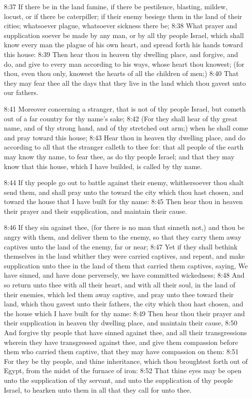 8:37 If there be in the land famine, if there be pestilence, blasting,
mildew, locust, or if there be caterpiller; if their enemy besiege
them in the land of their cities; whatsoever plague, whatsoever
sickness there be; 8:38 What prayer and supplication soever be made by
any man, or by all thy people Israel, which shall know every man the
plague of his own heart, and spread forth his hands toward this house:
8:39 Then hear thou in heaven thy dwelling place, and forgive, and do,
and give to every man according to his ways, whose heart thou knowest;
(for thou, even thou only, knowest the hearts of all the children of
men;) 8:40 That they may fear thee all the days that they live in the
land which thou gavest unto our fathers.

8:41 Moreover concerning a stranger, that is not of thy people Israel,
but cometh out of a far country for thy name's sake; 8:42 (For they
shall hear of thy great name, and of thy strong hand, and of thy
stretched out arm;) when he shall come and pray toward this house;
8:43 Hear thou in heaven thy dwelling place, and do according to all
that the stranger calleth to thee for: that all people of the earth
may know thy name, to fear thee, as do thy people Israel; and that
they may know that this house, which I have builded, is called by thy
name.

8:44 If thy people go out to battle against their enemy, whithersoever
thou shalt send them, and shall pray unto the \LORD toward the city
which thou hast chosen, and toward the house that I have built for thy
name: 8:45 Then hear thou in heaven their prayer and their
supplication, and maintain their cause.

8:46 If they sin against thee, (for there is no man that sinneth not,)
and thou be angry with them, and deliver them to the enemy, so that
they carry them away captives unto the land of the enemy, far or near;
8:47 Yet if they shall bethink themselves in the land whither they
were carried captives, and repent, and make supplication unto thee in
the land of them that carried them captives, saying, We have sinned,
and have done perversely, we have committed wickedness; 8:48 And so
return unto thee with all their heart, and with all their soul, in the
land of their enemies, which led them away captive, and pray unto thee
toward their land, which thou gavest unto their fathers, the city
which thou hast chosen, and the house which I have built for thy name:
8:49 Then hear thou their prayer and their supplication in heaven thy
dwelling place, and maintain their cause, 8:50 And forgive thy people
that have sinned against thee, and all their transgressions wherein
they have transgressed against thee, and give them compassion before
them who carried them captive, that they may have compassion on them:
8:51 For they be thy people, and thine inheritance, which thou
broughtest forth out of Egypt, from the midst of the furnace of iron:
8:52 That thine eyes may be open unto the supplication of thy servant,
and unto the supplication of thy people Israel, to hearken unto them
in all that they call for unto thee.

